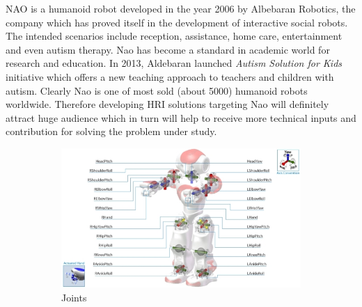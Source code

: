 NAO\cite{NaoTheRobot} is a humanoid robot developed in the year 2006 by Albebaran Robotics, the company which has proved itself in the development of interactive social robots. The intended scenarios include reception, assistance, home care, entertainment and even autism therapy. Nao has become a standard in academic world for research and education. In 2013, Aldebaran launched \emph{Autism Solution for Kids}\cite{ASKNao} initiative which offers a new teaching approach to teachers and children with autism. Clearly Nao is one of most sold (about 5000) humanoid robots worldwide. Therefore developing HRI solutions targeting Nao will definitely attract huge audience which in turn will help to receive more technical inputs and contribution for solving the problem under study.
\begin{figure}
\centering
\begin{subfigure}[b]{0.8\textwidth}
\includegraphics[width=\textwidth]{assets/nao_hardware_jointname.jpg}
\caption{Joints}
\label{fig:naojoint}
\end{subfigure}
\begin{subfigure}[b]{0.3\textwidth}

\end{subfigure}
\end{figure}
